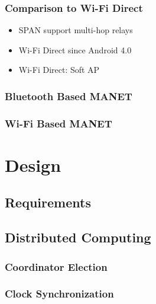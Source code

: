 		
			\subsection*{Comparison to Wi-Fi Direct}
			
				{\color{gray} 
					\begin{itemize}  
						\item SPAN support multi-hop relays
						\item Wi-Fi Direct since Android 4.0
						\item Wi-Fi Direct: Soft AP 
					\end{itemize}
				}
		
			\subsection*{Bluetooth Based \gls{MANET} }

			\subsection*{Wi-Fi Based \gls{MANET}}
	
\chapter{Design }

	\section{Requirements}
	

	\section{Distributed Computing}

		\subsection*{Coordinator Election}
		
		\subsection*{Clock Synchronization}
		
